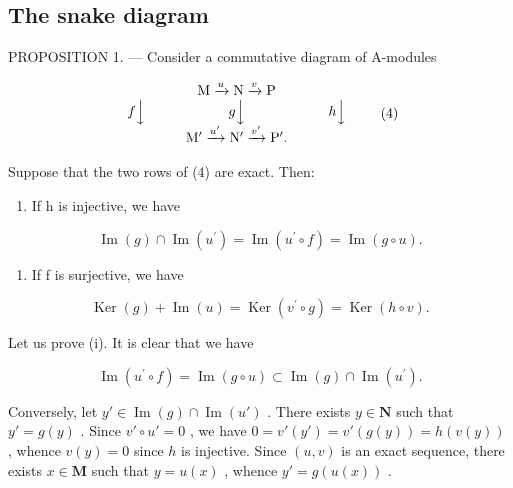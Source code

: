 \subsection{The snake diagram}

PROPOSITION 1. --- Consider a commutative diagram of A-modules

\[
\begin{array}{c} \mathrm{M} \xrightarrow {u} \mathrm{N} \xrightarrow {v} \mathrm{P} \\ f \Big \downarrow \qquad \qquad \qquad g \Big \downarrow \qquad \qquad \qquad h \Big \downarrow \\ \mathrm{M} ^ {\prime} \xrightarrow {u ^ {\prime}} \mathrm{N} ^ {\prime} \xrightarrow {v ^ {\prime}} \mathrm{P} ^ {\prime}. \end{array}\tag{4}
\]

Suppose that the two rows of (4) are exact. Then:

\begin{enumerate}
\def\labelenumi{(\roman{enumi})}
\tightlist
\item
  If h is injective, we have
\end{enumerate}

\[
\operatorname{Im} (g) \cap \operatorname{Im} \left(u ^ {\prime}\right) = \operatorname{Im} \left(u ^ {\prime} \circ f\right) = \operatorname{Im} (g \circ u).\tag{5}
\]

\begin{enumerate}
\def\labelenumi{(\roman{enumi})}
\setcounter{enumi}{1}
\tightlist
\item
  If f is surjective, we have
\end{enumerate}

\[
\operatorname{Ker} (g) + \operatorname{Im} (u) = \operatorname{Ker} \left(v ^ {\prime} \circ g\right) = \operatorname{Ker} (h \circ v).\tag{6}
\]

Let us prove (i). It is clear that we have

\[
\operatorname{Im} \left(u ^ {\prime} \circ f\right) = \operatorname{Im} (g \circ u) \subset \operatorname{Im} (g) \cap \operatorname{Im} \left(u ^ {\prime}\right).
\]

Conversely, let \(y' \in \operatorname{Im}(g) \cap \operatorname{Im}(u')\) . There exists \(y \in \mathbf{N}\) such that \(y' = g(y)\) . Since \(v' \circ u' = 0\) , we have \(0 = v'(y') = v'(g(y)) = h(v(y))\) , whence \(v(y) = 0\) since \(h\) is injective. Since \((u, v)\) is an exact sequence, there exists \(x \in \mathbf{M}\) such that \(y = u(x)\) , whence \(y' = g(u(x))\) .


